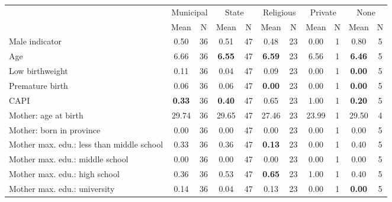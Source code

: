 \begin{tabular}{l c c c c c c c c c c}
\toprule
& \multicolumn{2}{c}{Municipal} & \multicolumn{2}{c}{State} & \multicolumn{2}{c}{Religious} & \multicolumn{2}{c}{Private} & \multicolumn{2}{c}{None} \\
& \scriptsize Mean & \scriptsize N & \scriptsize Mean & \scriptsize N & \scriptsize Mean & \scriptsize N & \scriptsize Mean & \scriptsize N & \scriptsize Mean & \scriptsize N \\
\midrule
Male indicator &      0.50 &        36 &      0.51 &        47 &      0.48 &        23 &      0.00 &         1 &      0.80 &         5 \\
Age &      6.66 &        36 & \textbf{     6.55} &        47 & \textbf{     6.59} &        23 &      6.56 &         1 & \textbf{     6.46} &         5 \\
Low birthweight &      0.11 &        36 &      0.04 &        47 &      0.09 &        23 &      0.00 &         1 & \textbf{     0.00} &         5 \\
Premature birth &      0.06 &        36 &      0.06 &        47 & \textbf{     0.00} &        23 &      0.00 &         1 & \textbf{     0.00} &         5 \\
CAPI & \textbf{     0.33} &        36 & \textbf{     0.40} &        47 &      0.65 &        23 &      1.00 &         1 & \textbf{     0.20} &         5 \\
Mother: age at birth &     29.74 &        36 &     29.65 &        47 &     27.46 &        23 &     23.99 &         1 &     29.50 &         4 \\
Mother: born in province &      0.00 &        36 &      0.00 &        47 &      0.00 &        23 &      0.00 &         1 &      0.00 &         5 \\
Mother max. edu.: less than middle school &      0.33 &        36 &      0.36 &        47 & \textbf{     0.13} &        23 &      0.00 &         1 &      0.40 &         5 \\
Mother max. edu.: middle school &      0.00 &        36 &      0.00 &        47 &      0.00 &        23 &      0.00 &         1 &      0.00 &         5 \\
Mother max. edu.: high school &      0.36 &        36 &      0.53 &        47 & \textbf{     0.65} &        23 &      1.00 &         1 &      0.40 &         5 \\
Mother max. edu.: university &      0.14 &        36 &      0.04 &        47 &      0.13 &        23 &      0.00 &         1 & \textbf{     0.00} &         5 \\

\end{tabular}
